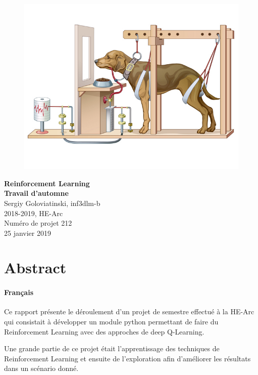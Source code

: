 \documentclass[a4paper,10pt,openany,oneside]{report}
\begin{document}
\vspace*{1cm}
\begin{figure}
	\centering
	\includegraphics[scale=0.5]{img/pavlovs_dog.jpg}
\end{figure}
\vspace*{2cm}
\begin{center}
	\textbf{\Huge Reinforcement Learning} \\[1cm]
	\textbf{\Huge Travail d'automne} \\[0.5cm]
	{\Large Sergiy Goloviatinski, inf3dlm-b\\2018-2019, HE-Arc\\Numéro de projet 212}
	\\[4cm]
	25 janvier 2019
\end{center}

\setcounter{tocdepth}{3}
\setcounter{secnumdepth}{3}

\chapter*{Abstract}
\thispagestyle{empty}
\subsubsection*{Français}
Ce rapport présente le déroulement d'un projet de semestre effectué à la HE-Arc qui consistait à développer un module python permettant de faire du Reinforcement Learning avec des approches de deep Q-Learning.

Une grande partie de ce projet était l'apprentissage des techniques de Reinforcement Learning et ensuite de l'exploration afin d'améliorer les résultats dans un scénario donné.
\end{document}
